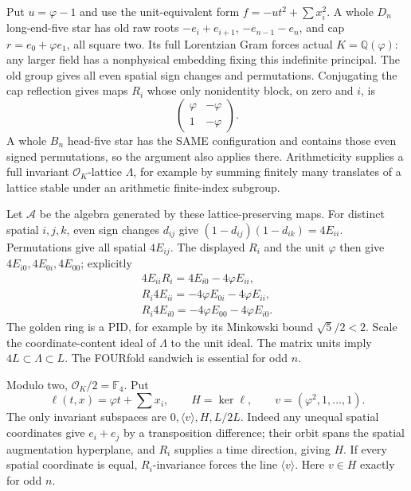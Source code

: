 Put \(u=\varphi-1\) and use the unit-equivalent
form \(f=-ut^2+\sum x_i^2\).
A whole \(D_n\) long-end-five star has old raw
roots \(-e_i+e_{i+1}\), \(-e_{n-1}-e_n\),
and cap \(r=e_0+\varphi e_1\), all square two.
Its full Lorentzian Gram forces actual
\(K=\mathbb Q(\varphi)\): any larger field has
a nonphysical embedding fixing this indefinite
principal.
The old group gives all even spatial sign
changes and permutations.
Conjugating the cap reflection gives maps \(R_i\)
whose only nonidentity block, on zero and \(i\), is
\[
                         \begin{pmatrix}\varphi&-\varphi\\
                                          1&-\varphi\end{pmatrix}.
\]
A whole \(B_n\) head-five star has the SAME
configuration and contains those even signed
permutations, so the argument also applies there.
Arithmeticity supplies a full invariant
\(\mathcal O_K\)-lattice \(\Lambda\), for example
by summing finitely many translates of a lattice
stable under an arithmetic finite-index subgroup.

Let \(\mathcal A\) be the algebra generated by
these lattice-preserving maps.
For distinct spatial \(i,j,k\), even sign
changes \(d_{ij}\) give
\((1-d_{ij})(1-d_{ik})=4E_{ii}\).
Permutations give all spatial \(4E_{ij}\).
The displayed \(R_i\) and the unit \(\varphi\)
then give \(4E_{i0},4E_{0i},4E_{00}\);
explicitly
\[
 \begin{gathered}
 4E_{ii}R_i=4E_{i0}-4\varphi E_{ii},\\
 R_i4E_{ii}=-4\varphi E_{0i}-4\varphi E_{ii},\\
 R_i4E_{i0}=-4\varphi E_{00}-4\varphi E_{i0}.
 \end{gathered}
\]
The golden ring is a PID, for example by its
Minkowski bound \(\sqrt5/2<2\).
Scale the coordinate-content ideal of \(\Lambda\)
to the unit ideal.
The matrix units imply
\(4L\subset\Lambda\subset L\).
The FOURfold sandwich is essential for odd \(n\).

Modulo two, \(\mathcal O_K/2=\mathbb F_4\).
Put
\[
 \ell(t,x)=\varphi t+\sum x_i,\qquad
 H=\ker\ell,\qquad v=(\varphi^2,1,\ldots,1).
\]
The only invariant subspaces are
\(0,\langle v\rangle,H,L/2L\).
Indeed any unequal spatial coordinates give
\(e_i+e_j\) by a transposition difference;
their orbit spans the spatial augmentation
hyperplane, and \(R_i\) supplies a time direction,
giving \(H\).
If every spatial coordinate is equal,
\(R_i\)-invariance forces the line \(\langle v\rangle\).
Here \(v\in H\) exactly for odd \(n\).

